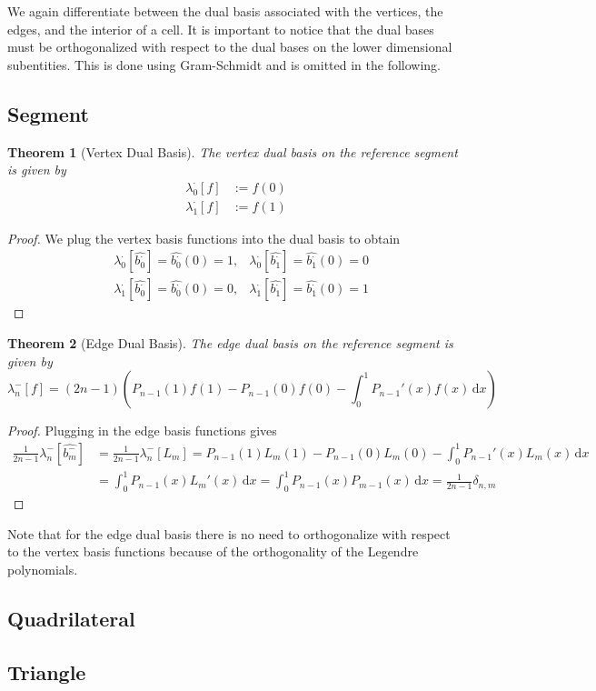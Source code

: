 \documentclass[10pt,a4paper]{article}
\newtheorem{thm}{Theorem}
\begin{document}
    We again differentiate between the dual basis associated with the vertices, the edges, and the interior of a cell. It is important to notice that the dual bases must be orthogonalized with respect to the dual bases on the lower dimensional subentities. This is done using Gram-Schmidt and is omitted in the following.


\subsection{Segment}

    \begin{thm}[Vertex Dual Basis]
        The vertex dual basis on the reference segment is given by
        \begin{align*}
            \lambda_0^{\cdot}[f] &:= f(0) \\
            \lambda_1^{\cdot}[f] &:= f(1)
        \end{align*}
    \end{thm}
    \begin{proof}
        We plug the vertex basis functions into the dual basis to obtain
        \begin{align*}
            &\lambda_0^{\cdot}[\widehat{b_0^{\cdot}}] = \widehat{b_0^{\cdot}}(0) = 1, &\lambda_0^{\cdot}[\widehat{b_1^{\cdot}}] = \widehat{b_1^{\cdot}}(0) = 0 \\
            &\lambda_1^{\cdot}[\widehat{b_0^{\cdot}}] = \widehat{b_0^{\cdot}}(0) = 0, &\lambda_1^{\cdot}[\widehat{b_1^{\cdot}}] = \widehat{b_1^{\cdot}}(0) = 1
        \end{align*}
    \end{proof}

    \begin{thm}[Edge Dual Basis]
        The edge dual basis on the reference segment is given by
        \begin{equation*}
            \lambda_n^{-}[f] = (2n-1) \left( P_{n-1}(1)f(1) - P_{n-1}(0)f(0) - \int_0^1\! P_{n-1}'(x)f(x) \,\mathrm{d}x \right)
        \end{equation*}
    \end{thm}
    \begin{proof}
        Plugging in the edge basis functions gives
        \begin{align*}
            \frac{1}{2n-1}\lambda_n^{-}[\widehat{b_m^{-}}] &= \frac{1}{2n-1}\lambda_n^{-}[L_m] = P_{n-1}(1)L_m(1) - P_{n-1}(0)L_m(0) - \int_0^1\! P_{n-1}'(x)L_m(x) \,\mathrm{d}x \\
            &= \int_0^1\! P_{n-1}(x)L_m'(x) \,\mathrm{d}x = \int_0^1\! P_{n-1}(x)P_{m-1}(x) \,\mathrm{d}x = \frac{1}{2n-1}\delta_{n,m}
        \end{align*}
    \end{proof}

    Note that for the edge dual basis there is no need to orthogonalize with respect to the vertex basis functions because of the orthogonality of the Legendre polynomials.


\subsection{Quadrilateral}


\subsection{Triangle}
    
\end{document}
